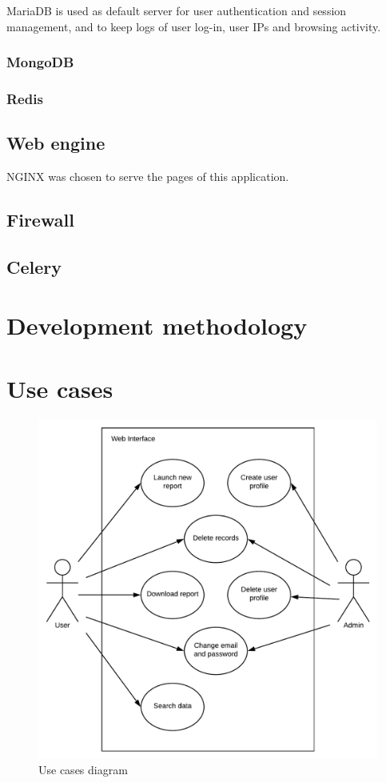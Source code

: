 MariaDB is used as default server for user authentication and session
management, and to keep logs of user log-in, user IPs and browsing activity.


\subsubsection{MongoDB}

\subsubsection{Redis}

\subsection{Web engine}
NGINX was chosen to serve the pages of this application.

\subsection{Firewall}

\subsection{Celery}

\section{Development methodology}

\section{Use cases}

\begin{figure}[h!]
\centering
\includegraphics[scale=0.4]{imgs/UseCasesDiag.pdf}
\caption{Use cases diagram}
\label{fig:sysarch}
\end{figure}

